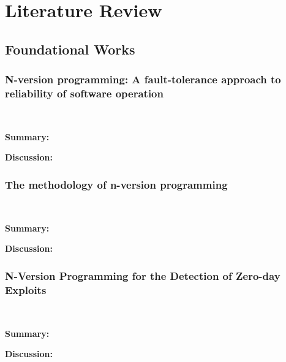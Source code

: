 \documentclass[article]{IEEEtran}
\begin{document}
\section{Literature Review}

\subsection{Foundational Works}


\subsubsection{N-version programming: A fault-tolerance approach to reliability of software operation}
\cite{chen1978n}
\hfill\\
\par
\textbf{Summary:} 
\par
\textbf{Discussion:}
\subsubsection{The methodology of n-version programming}
\cite{avizienis1995methodology}
\hfill\\
\par
\textbf{Summary:} 
\par
\textbf{Discussion:}
\subsubsection{N-Version Programming for the Detection of Zero-day Exploits}
\cite{zerodayexp}
\hfill\\
\par
\textbf{Summary:} 
\par
\textbf{Discussion:}
\end{document}
